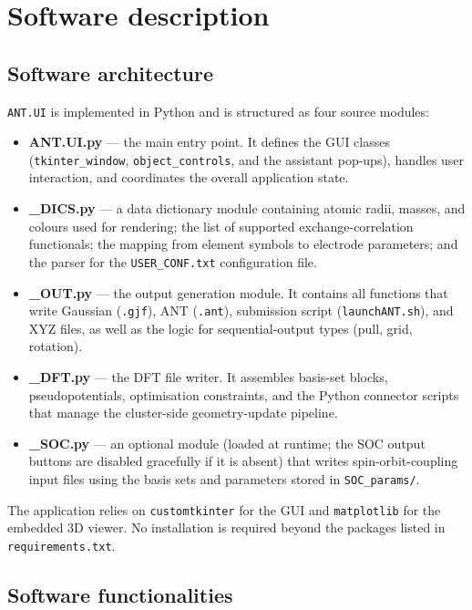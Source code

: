\documentclass[preprint,12pt, a4paper]{elsarticle}
\begin{document}
\section{Software description}

\subsection{Software architecture}

\texttt{ANT.UI} is implemented in Python and is structured as four source modules:

\begin{itemize}
    \item \textbf{ANT.UI.py} — the main entry point. It defines the GUI classes (\texttt{tkinter\_window}, \texttt{object\_controls}, and the assistant pop-ups), handles user interaction, and coordinates the overall application state.
    \item \textbf{\_DICS.py} — a data dictionary module containing atomic radii, masses, and colours used for rendering; the list of supported exchange-correlation functionals; the mapping from element symbols to electrode parameters; and the parser for the \texttt{USER\_CONF.txt} configuration file.
    \item \textbf{\_OUT.py} — the output generation module. It contains all functions that write Gaussian (\texttt{.gjf}), ANT (\texttt{.ant}), submission script (\texttt{launchANT.sh}), and XYZ files, as well as the logic for sequential-output types (pull, grid, rotation).
    \item \textbf{\_DFT.py} — the DFT file writer. It assembles basis-set blocks, pseudopotentials, optimisation constraints, and the Python connector scripts that manage the cluster-side geometry-update pipeline.
    \item \textbf{\_SOC.py} — an optional module (loaded at runtime; the SOC output buttons are disabled gracefully if it is absent) that writes spin-orbit-coupling input files using the basis sets and parameters stored in \texttt{SOC\_params/}.
\end{itemize}

The application relies on \texttt{customtkinter} for the GUI and \texttt{matplotlib} for the embedded 3D viewer. No installation is required beyond the packages listed in \texttt{requirements.txt}.

\subsection{Software functionalities}
\end{document}
